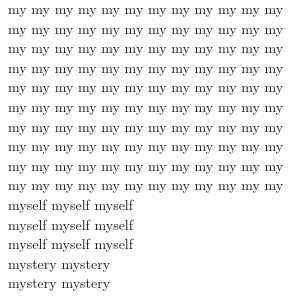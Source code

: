 my my my my my my my my my my my my\\
my my my my my my my my my my my my\\
my my my my my my my my my my my my\\
my my my my my my my my my my my my\\
my my my my my my my my my my my my\\
my my my my my my my my my my my my\\
my my my my my my my my my my my my\\
my my my my my my my my my my my my\\
my my my my my my my my my my my my\\
my my my my my my my my my my my my\\
myself myself myself\\
myself myself myself\\
myself myself myself\\
mystery mystery\\
mystery mystery\\


